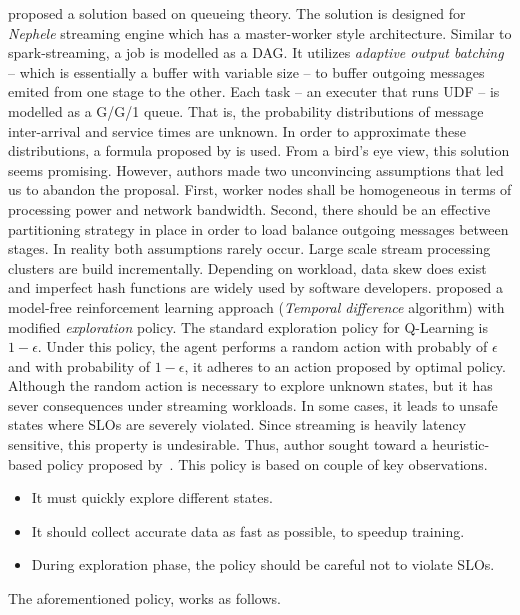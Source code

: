\textcite{Lohrmann:2015} proposed a solution based on queueing theory. The solution is designed for \emph{Nephele}\cite{Lohrmann:2014} streaming engine which has a master-worker style architecture. Similar to spark-streaming, a job is modelled as a DAG. It utilizes \emph{adaptive output batching}\cite{Warneke:2011} -- which is essentially a buffer with variable size -- to buffer outgoing messages emited from one stage to the other. Each task -- an executer that runs UDF -- is modelled as a G/G/1 queue. That is, the probability distributions of message inter-arrival and service times are unknown. In order to approximate these distributions, a formula proposed by \textcite{Kingman:1961} is used. From a bird's eye view, this solution seems promising. However, authors made two unconvincing assumptions that led us to abandon the proposal. First, worker nodes shall be homogeneous in terms of processing power and network bandwidth. Second, there should be an effective partitioning strategy in place in order to load balance outgoing messages between stages. In reality both assumptions rarely occur. Large scale stream processing clusters are build incrementally. Depending on workload, data skew does exist and imperfect hash functions are widely used by software developers.
\newpage
\textcite{Dutreilh2010} proposed a model-free reinforcement learning approach (\emph{Temporal difference} algorithm) with modified \emph{exploration} policy. The standard exploration policy for Q-Learning is $1-\epsilon$. Under this policy, the agent performs a random action with probably of $\epsilon$ and with probability of $1-\epsilon$, it adheres to an action proposed by optimal policy. Although the random action is necessary to explore unknown states, but it has sever consequences under streaming workloads. In some cases, it leads to unsafe states where SLOs are severely violated. Since streaming is heavily latency sensitive, this property is undesirable. Thus, author sought toward a heuristic-based policy proposed by~\textcite{Bodik:2009}. This policy is based on couple of key observations.
\begin{itemize}
\item It must quickly explore different states.
\item It should collect accurate data as fast as possible, to speedup training.
\item During exploration phase, the policy should be careful not to violate SLOs.
\end{itemize}
The aforementioned policy, works as follows.
